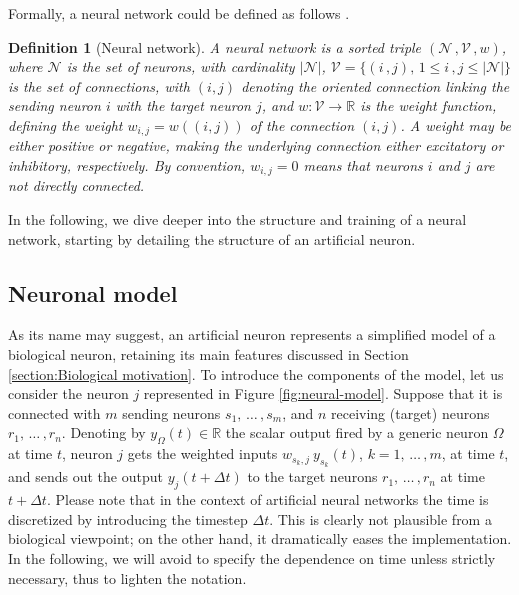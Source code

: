 \documentclass[12pt, a4paper, twoside, openright]{report}
\numberwithin{equation}{chapter}
\theoremstyle{theorem}
\theoremstyle{definition}
\newtheorem{definition}{Definition}[chapter]
\theoremstyle{remark}
\theoremstyle{proposition}
\numberwithin{figure}{chapter}
\begin{document}
		Formally, a neural network could be defined as follows \cite{Kri}.
		
		\begin{definition}[Neural network]
			\label{def:neural-network}
			\emph{
			A \emph{neural network} is a sorted triple $\left( \mathcal{N} \, , \mathcal{V} \, , w \right)$, where $\mathcal{N}$ is the set of \emph{neurons}, with cardinality $|\mathcal{N}|$, $\mathcal{V} = \big\lbrace (i \, , j), \, 1 \leq i \, , j  \leq |\mathcal{N}| \big\rbrace$ is the set of \emph{connections}, with $(i,j)$ denoting the oriented connection linking the sending neuron $i$ with the target neuron $j$, and $w : \mathcal{V} \rightarrow \mathbb{R}$ is the \emph{weight function}, defining the weight $w_{i,j} = w((i,j))$ of the connection $(i,j)$. A weight may be either positive or negative, making the underlying connection either excitatory or inhibitory, respectively. By convention, $w_{i,j} = 0$ means that neurons $i$ and $j$ are not directly connected.
			}
		\end{definition}
		
		In the following, we dive deeper into the structure and training of a neural network, starting by detailing the structure of an artificial neuron.  
		
	\vspace*{0.3cm}
														
	\subsection{Neuronal model}
	\label{section:Neuronal model}
	
		As its name may suggest, an artificial neuron represents a simplified model of a biological neuron, retaining its main features discussed in Section \ref{section:Biological motivation}. To introduce the components of the model, let us consider the neuron $j$ represented in Figure \ref{fig:neural-model}. Suppose that it is connected with $m$ sending neurons $s_1, \, \ldots \, , s_m$, and $n$ receiving (target) neurons $r_1, \, \ldots \, , r_n$. Denoting by $y_{\Omega}(t) \in \mathbb{R}$ the scalar output fired by a generic neuron $\Omega$ at time $t$, neuron $j$ gets the weighted inputs $w_{s_k,j} ~ y_{s_k}(t)$, $k = 1, \, \ldots \, , m$, at time $t$, and sends out the output $y_j(t + \Delta t)$ to the target neurons $r_1, \, \ldots \, , r_n$ at time $t + \Delta t$. Please note that in the context of artificial neural networks the time is discretized by introducing the timestep $\Delta t$. This is clearly not plausible from a biological viewpoint; on the other hand, it dramatically eases the implementation. In the following, we will avoid to specify the dependence on time unless strictly necessary, thus to lighten the notation.
		
\end{document}
